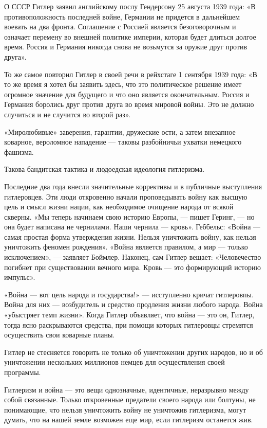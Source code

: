 \documentclass[12pt, a4paper, openany]{book}
\begin{document}
О СССР Гитлер заявил английскому послу Гендерсону 25 августа 1939 года: «В противоположность последней войне, Германии не придется в дальнейшем воевать на два фронта. Соглашение с Россией является безоговорочным и означает перемену во внешней политике империи, которая будет длиться долгое время. Россия и Германия никогда снова не возьмутся за оружие друг против друга».

То же самое повторил Гитлер в своей речи в рейхстаге 1 сентября 1939 года: «В то же время я хотел бы заявить здесь, что это политическое решение имеет огромное значение для будущего и что оно является окончательным. Россия и Германия боролись друг против друга во время мировой войны. Это не должно случиться и не случится во второй раз».

«Миролюбивые» заверения, гарантии, дружеские ости, а затем внезапное коварное, вероломное нападение — таковы разбойничьи ухватки немецкого фашизма.

Такова бандитская тактика и людоедская идеология гитлеризма.

Последние два года внесли значительные коррективы и в публичные выступления гитлеровцев. Эти люди откровенно начали проповедывать войну как высшую цель и смысл жизни нации, как необходимое очищение народа от всякой скверны. «Мы теперь начинаем свою историю Европы, — пишет Геринг, — но она будет написана не чернилами. Наши чернила — кровь». Геббельс: «Война — самая простая форма утверждения жизни. Нельзя уничтожить войну, как нельзя уничтожить феномен рождения». «Война является правилом, а мир — только исключением», — заявляет Боймлер. Наконец, сам Гитлер вещает: «Человечество погибнет при существовании вечного мира. Кровь — это формирующий историю импульс».

«Война — вот цель народа и государства!» — исступленно кричат гитлеровпы. Война для них — возбудитель и средство продления жизни любого народа. Война «убыстряет темп жизни». Когда Гитлер объявляет, что война — это он, Гитлер, тогда ясно раскрываются средства, при помощи которых гитлеровцы стремятся осуществить свои коварные планы.

Гитлер не стесняется говорить не только об уничтожении других народов, но и об уничтожении нескольких миллионов немцев для осуществления своей программы.

Гитлеризм и война — это вещи однозначные, идентичные, неразрывно между собой связанные. Только откровенные предатели своего народа или болтуны, не понимающие, что нельзя уничтожить войну не уничтожив гитлеризма, могут думать, что на нашей земле возможен еще мир, если гитлеризм останется жив.
\end{document}

